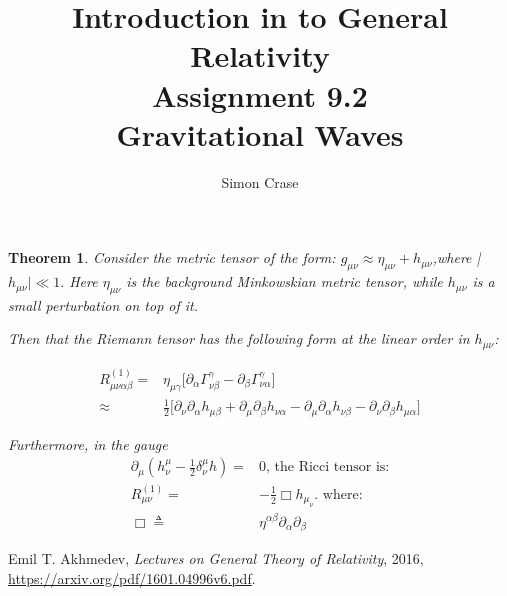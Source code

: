 \documentclass[]{article}
\title{Introduction in to General Relativity\\Assignment 9.2\\Gravitational Waves}
\author{Simon Crase}
\newtheorem{theorem}{Theorem}
\begin{document}
\maketitle


\begin{theorem}
Consider the metric tensor of the form: $g_{\mu\nu} \approx \eta_{\mu\nu} + h_{\mu\nu}$,where |$h_{\mu\nu}| \ll 1.$ Here $\eta_{\mu\nu}$ is the background Minkowskian metric tensor, while $h_{\mu\nu}$ is a small perturbation on top of it.

Then that the Riemann tensor has the following form at the linear order in $h_{\mu\nu}$:

\begin{align*}
R^{(1)}_{\mu\nu\alpha\beta} =& \eta_{\mu\gamma}\big[\partial_{\alpha}\Gamma^{\gamma}_{\nu\beta} - \partial_{\beta}\Gamma^{\gamma}_{\nu\alpha}\big]\\
\approx& \frac{1}{2}\big[\partial_{\nu}\partial_{\alpha}h_{\mu\beta} + \partial_{\mu}\partial_{\beta}h_{\nu\alpha} - \partial_{\mu}\partial_{\alpha}h_{\nu\beta} - \partial_{\nu}\partial_{\beta}h_{\mu\alpha}\big]
\end{align*}

Furthermore, in the gauge 
\begin{align*}
\partial_{\mu}(h^{\mu}_{\nu}-\frac{1}{2}\delta^{\mu}_{\nu}h)=&0\text{, the Ricci tensor is:}\\
R^{(1)}_{\mu\nu} =& - \frac{1}{2} \Box h_{\mu_{\nu}} \text{. where:}\\
\Box \triangleq & \eta^{\alpha\beta}\partial_{\alpha}\partial_{\beta}
\end{align*}
 

\end{theorem}


\begin{thebibliography}{9}
	
	Emil T. Akhmedev,
	\emph{Lectures on General Theory of Relativity},
	2016,
	\url{https://arxiv.org/pdf/1601.04996v6.pdf}.
	
	
\end{thebibliography}
\end{document}
